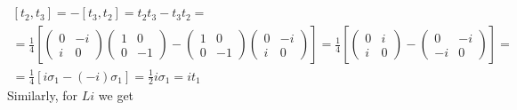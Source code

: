 \documentclass{article}
\begin{document}
\begin{equation}
\begin{gathered}
    \\
    \left[t_2,t_3\right] = - \left[t_3,t_2\right] = t_2t_3 - t_3t_2 = \\ = \frac{1}{4}\left[\begin{pmatrix}0&-i\\i&0\end{pmatrix}\begin{pmatrix}1&0\\0&-1\end{pmatrix} - \begin{pmatrix}1&0\\0&-1\end{pmatrix}\begin{pmatrix}0&-i\\i&0\end{pmatrix}\right] = \frac{1}{4}\left[\begin{pmatrix}0&i\\i&0\end{pmatrix} - \begin{pmatrix}0&-i\\-i&0\end{pmatrix}\right] = \\ = \frac{1}{4}\left[i\sigma_1 - \left(-i\right)\sigma_1\right] = \frac{1}{2}i\sigma_1 = it_1
\end{gathered}
\end{equation}
Similarly, for $Li$ we get
\end{document}
